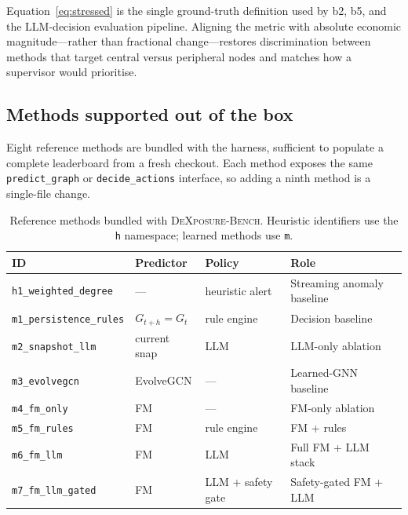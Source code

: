 Equation~\ref{eq:stressed} is the single ground-truth definition used
by b2, b5, and the LLM-decision evaluation pipeline.  Aligning the
metric with absolute economic magnitude---rather than fractional
change---restores discrimination between methods that target central
versus peripheral nodes and matches how a supervisor would
prioritise.

\subsection{Methods supported out of the box}

Eight reference methods are bundled with the harness, sufficient to
populate a complete leaderboard from a fresh checkout.  Each method
exposes the same \texttt{predict\_graph} or
\texttt{decide\_actions} interface, so adding a ninth method is a
single-file change.

\begin{table}[t]
\centering
\caption{Reference methods bundled with \textsc{DeXposure-Bench}.
Heuristic identifiers use the \texttt{h} namespace; learned methods
use \texttt{m}.}
\label{tab:bench-methods}
\footnotesize
\setlength{\tabcolsep}{6pt}
\begin{tabularx}{\linewidth}{@{}lllX@{}}
\toprule
ID & Predictor & Policy & Role \\
\midrule
\texttt{h1\_weighted\_degree}   & ---            & heuristic alert    & Streaming anomaly baseline \\
\texttt{m1\_persistence\_rules} & $G_{t+h}=G_t$  & rule engine        & Decision baseline \\
\texttt{m2\_snapshot\_llm}      & current snap   & LLM                & LLM-only ablation \\
\texttt{m3\_evolvegcn}          & EvolveGCN      & ---                & Learned-GNN baseline \\
\texttt{m4\_fm\_only}           & FM             & ---                & FM-only ablation \\
\texttt{m5\_fm\_rules}          & FM             & rule engine        & FM + rules \\
\texttt{m6\_fm\_llm}            & FM             & LLM                & Full FM + LLM stack \\
\texttt{m7\_fm\_llm\_gated}     & FM             & LLM + safety gate  & Safety-gated FM + LLM \\
\bottomrule
\end{tabularx}
\end{table}

